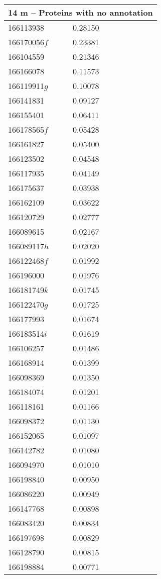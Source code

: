 \begin{landscape}
\begin{longtable}{p{1.8cm}p{0.9cm}p{2.2cm}p{1cm}p{2.8cm}p{13.4cm}}
\toprule
\multicolumn{6}{c}{\textbf{14 m -- Proteins with no annotation}} \\
\midrule
166113938&0.28150&&&& \\
166170056$f$&0.23381&&&& \\
166104559&0.21346&&&& \\
166166078&0.11573&&&& \\
166119911$g$&0.10078&&&& \\
166141831&0.09127&&&& \\
166155401&0.06411&&&& \\
166178565$f$&0.05428&&&& \\
166161827&0.05400&&&& \\
166123502&0.04548&&&& \\
166117935&0.04149&&&& \\
166175637&0.03938&&&& \\
166162109&0.03622&&&& \\
166120729&0.02777&&&& \\
166089615&0.02167&&&& \\
166089117$h$&0.02020&&&& \\
166122468$f$&0.01992&&&& \\
166196000&0.01976&&&& \\
166181749$k$&0.01745&&&& \\
166122470$g$&0.01725&&&& \\
166177993&0.01674&&&& \\
166183514$i$&0.01619&&&& \\
166106257&0.01486&&&& \\
166168914&0.01399&&&& \\
166098369&0.01350&&&& \\
166184074&0.01201&&&& \\
166118161&0.01166&&&& \\
166098372&0.01130&&&& \\
166152065&0.01097&&&& \\
166142782&0.01080&&&& \\
166094970&0.01010&&&& \\
166198840&0.00950&&&& \\
166086220&0.00949&&&& \\
166147768&0.00898&&&& \\
166083420&0.00834&&&& \\
166197698&0.00829&&&& \\
166128790&0.00815&&&& \\
166198884&0.00771&&&& \\

\end{longtable}
\end{landscape}
